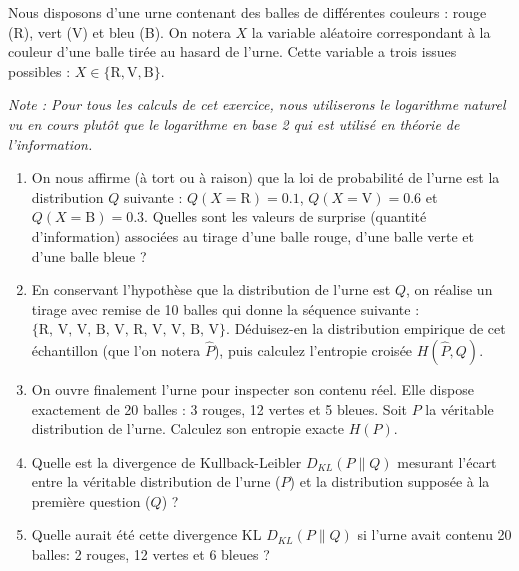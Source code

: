 \documentclass[solutions]{../exercices}
\begin{document}

	\begin{exercice}
		Nous disposons d'une urne contenant des balles de différentes couleurs : rouge (R), vert (V) et bleu (B). On notera $X$ la variable aléatoire correspondant à la couleur d'une balle tirée au hasard de l'urne. Cette variable a trois issues possibles : $X \in \{\text{R}, \text{V}, \text{B}\}$. 

		\textit{Note : Pour tous les calculs de cet exercice, nous utiliserons le logarithme naturel vu en cours plutôt que le logarithme en base 2 qui est utilisé en théorie de l'information.}

		\begin{enumerate}
			\item On nous affirme (à tort ou à raison) que la loi de probabilité de l'urne est la distribution $Q$ suivante : $Q(X=\text{R}) = 0.1$, $Q(X=\text{V}) = 0.6$ et $Q(X=\text{B}) = 0.3$. 
			Quelles sont les valeurs de surprise (quantité d'information) associées au tirage d'une balle rouge, d'une balle verte et d'une balle bleue ?

			\item En conservant l'hypothèse que la distribution de l'urne est $Q$, on réalise un tirage avec remise de 10 balles qui donne la séquence suivante : $\{\text{R, V, V, B, V, R, V, V, B, V}\}$. 
			Déduisez-en la distribution empirique de cet échantillon (que l'on notera $\hat{P}$), puis calculez l'entropie croisée $H(\hat{P}, Q)$.

			\item On ouvre finalement l'urne pour inspecter son contenu réel. Elle dispose exactement de 20 balles : 3 rouges, 12 vertes et 5 bleues. 
			Soit $P$ la véritable distribution de l'urne. Calculez son entropie exacte $H(P)$.

			\item Quelle est la divergence de Kullback-Leibler $D_{KL}(P \parallel Q)$ mesurant l'écart entre la véritable distribution de l'urne ($P$) et la distribution supposée à la première question ($Q$) ? 

			\item Quelle aurait été cette divergence KL $D_{KL}(P \parallel Q)$ si l'urne avait contenu 20 balles: 2 rouges, 12 vertes et 6 bleues ?
		\end{enumerate}
	\end{exercice}
\end{document}
